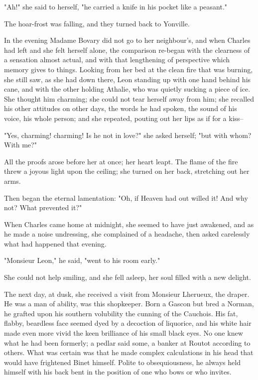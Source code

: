 \documentclass[11pt,twocolumn]{ltugboat}
\begin{document}
"Ah!" she said to herself, "he carried a knife in his pocket like a
peasant."

The hoar-frost was falling, and they turned back to Yonville.

In the evening Madame Bovary did not go to her neighbour's, and when
Charles had left and she felt herself alone, the comparison re-began
with the clearness of a sensation almost actual, and with that
lengthening of perspective which memory gives to things. Looking from
her bed at the clean fire that was burning, she still saw, as she had
down there, Leon standing up with one hand behind his cane, and with
the other holding Athalie, who was quietly sucking a piece of ice. She
thought him charming; she could not tear herself away from him; she
recalled his other attitudes on other days, the words he had spoken, the
sound of his voice, his whole person; and she repeated, pouting out her
lips as if for a kiss--

"Yes, charming! charming! Is he not in love?" she asked herself; "but
with whom? With me?"

All the proofs arose before her at once; her heart leapt. The flame of
the fire threw a joyous light upon the ceiling; she turned on her back,
stretching out her arms.

Then began the eternal lamentation: "Oh, if Heaven had out willed it!
And why not? What prevented it?"

When Charles came home at midnight, she seemed to have just awakened,
and as he made a noise undressing, she complained of a headache, then
asked carelessly what had happened that evening.

"Monsieur Leon," he said, "went to his room early."

She could not help smiling, and she fell asleep, her soul filled with a
new delight.

The next day, at dusk, she received a visit from Monsieur Lherueux, the
draper. He was a man of ability, was this shopkeeper. Born a Gascon but
bred a Norman, he grafted upon his southern volubility the cunning of
the Cauchois. His fat, flabby, beardless face seemed dyed by a
decoction of liquorice, and his white hair made even more vivid the
keen brilliance of his small black eyes. No one knew what he had been
formerly; a pedlar said some, a banker at Routot according to others.
What was certain was that he made complex calculations in his head that
would have frightened Binet himself. Polite to obsequiousness, he always
held himself with his back bent in the position of one who bows or who
invites.
\end{document}
